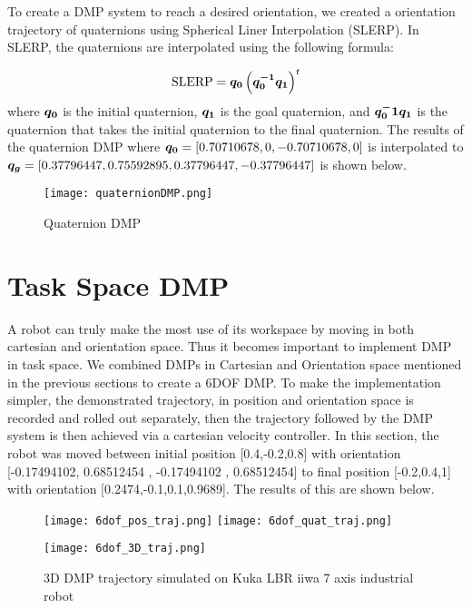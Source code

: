 To create a DMP system to reach a desired orientation, we created a orientation trajectory of quaternions using Spherical Liner Interpolation
(SLERP). In SLERP, the quaternions are interpolated using the following formula:

\begin{equation}
    \text{SLERP} = \boldsymbol{q_0} \left( \boldsymbol{q_0^{-1} q_1} \right)^t
\end{equation}
where $\boldsymbol{q_0}$ is the initial quaternion, $\boldsymbol{q_1}$ is the goal quaternion, and $\boldsymbol{q_0^-1 q_1}$ is 
the quaternion that takes the initial quaternion to the final quaternion. The results of the quaternion DMP where 
$\boldsymbol{q_0} =[0.70710678,0,-0.70710678,0] $  is interpolated to 
$\boldsymbol{q_g} = [0.37796447 , 0.75592895  ,0.37796447, -0.37796447]$ is shown below.

\begin{figure}[h]
\centering
\texttt{[image: quaternionDMP.png]}
\caption{Quaternion DMP}
\label{fig:quaternionDMP}
\end{figure}




\section{Task Space DMP}
A robot can truly make the most use of its workspace by moving in both cartesian and orientation space. 
Thus it becomes important to implement DMP in task space. We combined DMPs in Cartesian and Orientation space mentioned in the previous sections to create a 6DOF DMP.
To make the implementation simpler, the demonstrated trajectory, in position and orientation space is recorded and rolled out separately,
then the trajectory followed by the DMP system is then achieved via a cartesian velocity controller. In this section, the robot was moved between initial position [0.4,-0.2,0.8] with 
orientation [-0.17494102, 0.68512454 , -0.17494102 , 0.68512454] 
to final position [-0.2,0.4,1] with orientation [0.2474,-0.1,0.1,0.9689]. The results of this are shown below.

\begin{figure}[h]
    \centering
    \texttt{[image: 6dof\_pos\_traj.png]}\quad
    \texttt{[image: 6dof\_quat\_traj.png]}

    \medskip

    \texttt{[image: 6dof\_3D\_traj.png]}

    \caption{3D DMP trajectory simulated on Kuka LBR iiwa 7 axis industrial robot}
    \label{fig:3D_only_taj_pybullet}
\end{figure}


